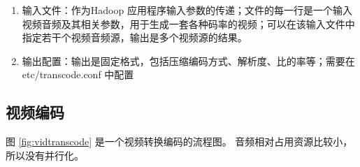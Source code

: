 \begin{enumerate}
  \item 输入文件：作为Hadoop 应用程序输入参数的传递；文件的每一行是一个输入视频音频及其相关参数，用于生成一套各种码率的视频；可以在该输入文件中指定若干个视频音频源，输出是多个视频源的结果。
  \item 输出配置：输出是固定格式，包括压缩编码方式、解析度、比的率等；需要在 etc/transcode.conf 中配置
\end{enumerate}




\subsection{视频编码}

图 \ref{fig:vidtranscode} 是一个视频转换编码的流程图。
音频相对占用资源比较小，所以没有并行化。






